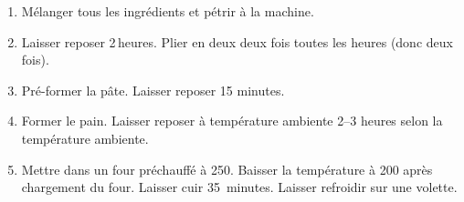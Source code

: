 
\begin{ingredients}
\end{ingredients}


\begin{recipe}
  \begin{enumerate}

  \item Mélanger tous les ingrédients et pétrir à la machine.
    
  \item Laisser reposer 2$\,$\fracH heures.  Plier en deux deux fois toutes
    les heures (donc deux fois).
    
  \item Pré-former la pâte.  Laisser reposer 15 minutes.
    
  \item Former le pain.  Laisser reposer à température ambiente 2--3
    heures selon la température ambiente.
    
  \item Mettre dans un four préchauffé à 250\degreeC.  Baisser la
    température à 200\degreeC{} après chargement du four.  Laisser cuir
    35~minutes.  Laisser refroidir sur une volette.

  \end{enumerate}
\end{recipe}

